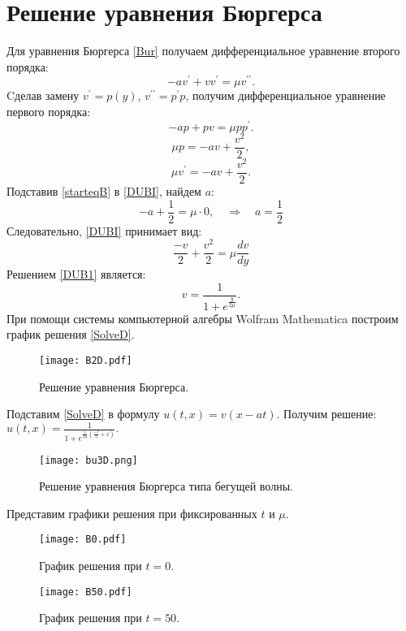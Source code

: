 \documentclass[unicode]{beamer}
\begin{document}
\section{ Решение уравнения Бюргерса}
Для уравнения Бюргерса \eqref{Bur} получаем дифференциальное  уравнение второго порядка:
\begin{equation} \label{DUB}
-av^\prime+vv^\prime={\mu}v^{\prime\prime}.
\end{equation}
Cделав замену $v^\prime=p(y)$, $v^{\prime\prime}=p^\prime p$, получим дифференциальное уравнение первого порядка:
\begin{equation} \label{DUB1}
-ap+pv={\mu}pp^\prime.
\end{equation}
\[
\mu p=-av+\frac{v^2}{2},
\]
\begin{equation} \label{DUBI}
\mu v^\prime=-av+\frac{v^2}{2}.
\end{equation}
Подставив \eqref{starteqB}  в \eqref{DUBI}, найдем $a$:
\[
-a+\frac{1}{2}=\mu\cdot0, \quad\Rightarrow\quad a=\frac{1}{2}
\]
Следовательно, \eqref{DUBI} принимает вид:
\begin{equation} \label{DUBI1}
\frac{-v}{2}+\frac{v^2}{2}={\mu}\frac{dv}{dy}
\end{equation}
Решением \eqref{DUB1} является:
\begin{equation} \label{SolveD}
v=\frac 1{1+e^{\frac{ y}{2\mu}}}.
\end{equation}
При помощи системы компьютерной алгебры Wolfram Mathematica  построим график решения \eqref{SolveD}.
\begin{figure}[H]
\centering
\texttt{[image: B2D.pdf]}
\caption{Решение уравнения Бюргерса.}
\label{ris:image}
\end{figure}
Подставим \eqref{SolveD} в формулу $u(t,x)=v(x-at)$. Получим решение:  $u(t,x)=\frac1{1+e^{\frac{1}{2\mu}\left(\frac{-t}{2}+x\right)}}.$

\begin{figure}[H]
\centering
\texttt{[image: bu3D.png]}
\caption{Решение уравнения Бюргерса типа бегущей волны.}
\label{ris:imageB}
\end{figure}
\newpage
Представим графики решения при фиксированных $t$ и $\mu$.
\begin{figure}[H]
\centering
\texttt{[image: B0.pdf]}
\caption{График решения при $t=0$.}
\label{ris:imageBt0}
\end{figure}
\begin{figure}[H]
\centering
\texttt{[image: B50.pdf]}
\caption{График решения при $t=50$.}
\label{ris:imageBt50}
\end{figure}
\newpage
\end{document}

